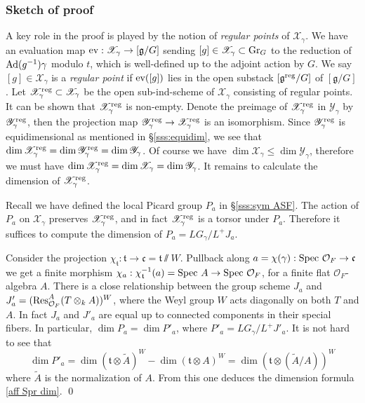\documentclass[]{pcmi}
\let\oldsubsubsection\subsubsection
\renewcommand{\subsubsection}[1]{%
\setcounter{subsubsection}{\value{equation}}%
\oldsubsubsection{#1}%
\refstepcounter{equation}%
}
\theoremstyle{plain}
\theoremstyle{definition}
\def\calO{\mathcal{O}}
\newcommand{\sX}{\ensuremath{\mathscr{X}}\xspace}
\newcommand{\sY}{\ensuremath{\mathscr{Y}}\xspace}
\newcommand{\sX}{\ensuremath{\mathcal{X}}\xspace}
\newcommand{\sY}{\ensuremath{\mathcal{Y}}\xspace}
\newcommand\frc{\mathfrak{c}}
\newcommand\frg{\mathfrak{g}}
\newcommand\frt{\mathfrak{t}}
\newcommand\tilA{\widetilde{A}}
\newcommand\ev{\textup{ev}}
\newcommand{\Gr}{\textup{Gr}}
\newcommand{\reg}{\textup{reg}}
\newcommand{\Res}{\textup{Res}}
\newcommand\Spec{\textup{Spec}\ }
\newcommand{\Ad}{\textup{Ad}}
\begin{document}
\subsubsection{Sketch of proof}\label{dim formula discussion} A key role in the proof is played by the notion of {\em regular points} of $\sX_{\gamma}$. We have an evaluation map $\ev: \sX_{\gamma}\to [\frg/G]$ sending $[g]\in\sX_{\gamma}\subset \Gr_{G}$ to the reduction of $\Ad(g^{-1})\gamma$ modulo $t$, which is well-defined up to the adjoint action by $G$.  We say $[g]\in \sX_{\gamma}$ is a {\em regular point} if $\ev([g])$ lies in the open substack $[\frg^{\reg}/G]$ of $[\frg/G]$. Let $\sX^{\reg}_{\gamma}\subset\sX_{\gamma}$ be the open sub-ind-scheme of $\sX_{\gamma}$ consisting of regular points. It can be shown that $\sX^{\reg}_{\gamma}$ is non-empty. Denote the preimage of $\sX^{\reg}_{\gamma}$ in $\sY_{\gamma}$ by $\sY^{\reg}_{\gamma}$, then the projection map $\sY^{\reg}_{\gamma}\to\sX^{\reg}_{\gamma}$ is an isomorphism. Since $\sY^{\reg}_{\gamma}$ is equidimensional as mentioned in \S\ref{sss:equidim}, we see that $\dim\sX^{\reg}_{\gamma}=\dim\sY^{\reg}_{\gamma}=\dim\sY_{\gamma}$. Of course we have $\dim\sX_{\gamma}\leq\dim \sY_{\gamma}$, therefore we must have $\dim \sX^{\reg}_{\gamma}=\dim \sX_{\gamma}=\dim \sY_{\gamma}$. It remains to calculate the dimension of $\sX^{\reg}_{\gamma}$.

Recall we have defined the local Picard group $P_{a}$ in \S\ref{sss:sym ASF}. The action of $P_{a}$ on $\sX_{\gamma}$ preserves $\sX^{\reg}_{\gamma}$, and in fact $\sX^{\reg}_{\gamma}$ is a torsor under $P_{a}$.  Therefore it suffices to compute the dimension of $P_{a}=LG_{\gamma}/L^{+}J_{a}$. 

Consider the projection $\chi_{\frt}: \frt\to\frc=\frt\sslash W$. Pullback along $a=\chi(\gamma):\Spec\calO_{F}\to\frc$ we get a finite morphism $\chi_{a}: \chi^{-1}_{\frt}(a)=\Spec A\to \Spec\calO_{F}$, for a finite flat $\calO_{F}$-algebra $A$. There is a close relationship between the group scheme $J_{a}$ and $J'_{a}=(\Res^{A}_{\calO_{F}}(T\otimes_{k}A))^{W}$, where the Weyl group $W$ acts diagonally on both $T$ and $A$.  In fact $J_{a}$ and $J'_{a}$ are equal up to connected components in their special fibers. In particular, $\dim P_{a}=\dim P'_{a}$, where $P'_{a}=LG_{\gamma}/L^{+}J'_{a}$. It is not hard to see that
\begin{equation*}
\dim P'_{a}=\dim (\frt\otimes \tilA)^{W}-\dim (\frt\otimes A)^{W}=\dim (\frt\otimes (\tilA/A))^{W}
\end{equation*}
where $\tilA$ is the normalization of $A$. From this one deduces the dimension formula \eqref{aff Spr dim}. \qed
\end{document}
